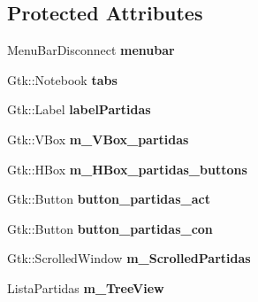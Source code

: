 \subsection*{Protected Attributes}
\begin{DoxyCompactItemize}
\item 
\hypertarget{classMainWindow_adc5c31aa7147c5273128a37c61531935}{Menu\-Bar\-Disconnect {\bfseries menubar}}\label{classMainWindow_adc5c31aa7147c5273128a37c61531935}

\item 
\hypertarget{classMainWindow_a528b74e7fb62a056c7db7e4cc3405f0e}{Gtk\-::\-Notebook {\bfseries tabs}}\label{classMainWindow_a528b74e7fb62a056c7db7e4cc3405f0e}

\item 
\hypertarget{classMainWindow_a3f6985d785f060685e1cd28526fa7f03}{Gtk\-::\-Label {\bfseries label\-Partidas}}\label{classMainWindow_a3f6985d785f060685e1cd28526fa7f03}

\item 
\hypertarget{classMainWindow_a07cf47f1cb3a6fe3e533390db18b9040}{Gtk\-::\-V\-Box {\bfseries m\-\_\-\-V\-Box\-\_\-partidas}}\label{classMainWindow_a07cf47f1cb3a6fe3e533390db18b9040}

\item 
\hypertarget{classMainWindow_ac6f0abacd5af95429201d40b4ec9ca95}{Gtk\-::\-H\-Box {\bfseries m\-\_\-\-H\-Box\-\_\-partidas\-\_\-buttons}}\label{classMainWindow_ac6f0abacd5af95429201d40b4ec9ca95}

\item 
\hypertarget{classMainWindow_ad6a19e7c9f49905bd7bc0c25a1cd50f2}{Gtk\-::\-Button {\bfseries button\-\_\-partidas\-\_\-act}}\label{classMainWindow_ad6a19e7c9f49905bd7bc0c25a1cd50f2}

\item 
\hypertarget{classMainWindow_a1af69f7c49665084fb746433fb7e6fd3}{Gtk\-::\-Button {\bfseries button\-\_\-partidas\-\_\-con}}\label{classMainWindow_a1af69f7c49665084fb746433fb7e6fd3}

\item 
\hypertarget{classMainWindow_a395e40c010bd07252453e9adc64faeb4}{Gtk\-::\-Scrolled\-Window {\bfseries m\-\_\-\-Scrolled\-Partidas}}\label{classMainWindow_a395e40c010bd07252453e9adc64faeb4}

\item 
\hypertarget{classMainWindow_a37807219b285408f8d30efe28a822e62}{Lista\-Partidas {\bfseries m\-\_\-\-Tree\-View}}\label{classMainWindow_a37807219b285408f8d30efe28a822e62}


\end{DoxyCompactItemize}
